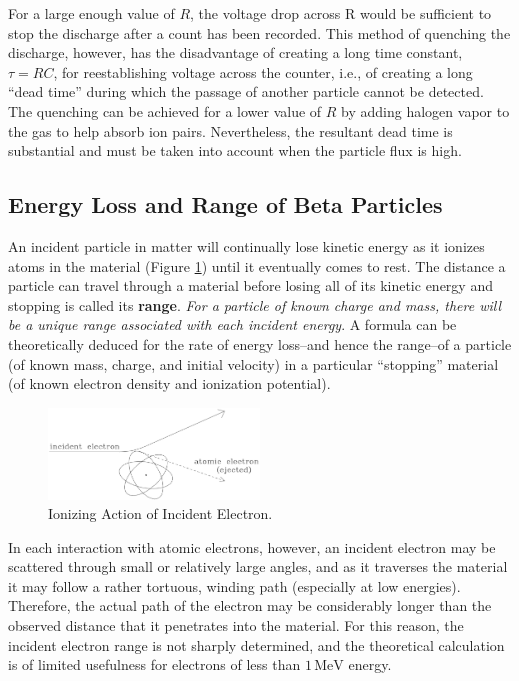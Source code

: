For a large enough value of $R$, the voltage drop across R would be sufficient to stop the discharge after a count has been recorded. This method of quenching the discharge, however, has the disadvantage of creating a long time constant, $\tau = RC$, for reestablishing voltage across the counter, i.e., of creating a long ``dead time'' during which the passage of another particle cannot be detected. The quenching can be achieved for a lower value of $R$ by adding halogen vapor to the gas to help absorb ion pairs. Nevertheless, the resultant dead time is substantial and must be taken into account when the particle flux is high.

\subsection{Energy Loss and Range of Beta Particles}
An incident particle in matter will continually lose kinetic energy as it ionizes atoms in the material (Figure {\ref{fig:ionizing}}) until it eventually comes to rest. The distance a particle can travel through a material before losing all of its kinetic energy and stopping is called its \textbf{range}. \emph{For a particle of known charge and mass, there will be a unique range associated with each incident energy}. A formula can be theoretically deduced for the rate of energy loss--and hence the range--of a particle (of known mass, charge, and initial velocity) in a particular ``stopping'' material (of known electron density and ionization potential).
\begin{figure}[h]
\centering
\includegraphics[width=0.5\textwidth]{./Exp10/pic/image5.png}
\caption{Ionizing Action of Incident Electron.}
\label{fig:ionizing}
\end{figure}

In each interaction with atomic electrons, however, an incident electron may be scattered through small or relatively large angles, and as it traverses the material it may follow a rather tortuous, winding path (especially at low energies). Therefore, the actual path of the electron may be considerably longer than the observed distance that it penetrates into the material. For this reason, the incident electron range is not sharply determined, and the theoretical calculation is of limited usefulness for electrons of less than $1\, \mathrm{MeV}$ energy.\myskip

